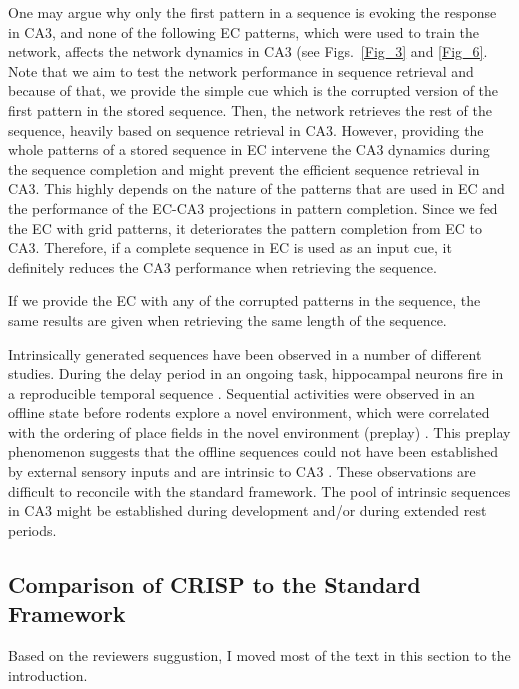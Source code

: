 \documentclass[utf8]{frontiersSCNS} %
\begin{document}
One may argue why only the first pattern in a sequence is evoking the response in CA3, and none of the following EC patterns, which were used to train the network, affects the network dynamics in CA3 (see Figs.~\ref{Fig_3} and \ref{Fig_6}.  
Note that we aim to test the network performance in sequence retrieval and because of that, we provide the simple cue which is the corrupted version of the first pattern in the stored sequence. Then, the network retrieves the rest of the sequence, heavily based on sequence retrieval in CA3. 
However, providing the whole patterns of a stored sequence in EC intervene the CA3 dynamics during the sequence completion and might prevent the efficient sequence retrieval in CA3. This highly depends on the nature of the patterns that are used in EC and the performance of the EC-CA3 projections in pattern completion. Since we fed the EC with grid patterns, it deteriorates the pattern completion from EC to CA3. Therefore, if a complete sequence in EC is used as an input cue, it definitely reduces the CA3 performance when retrieving the sequence.

If we provide the EC with any of the corrupted patterns in the sequence, the same results are given when retrieving the same length of the sequence.  



Intrinsically generated sequences have been observed in a number of different studies. During the delay period in an ongoing task, hippocampal neurons fire in a reproducible temporal sequence \citep{pastalkova2008internally, macdonald2011hippocampal}.  Sequential activities were observed in an offline state before rodents explore a novel environment, which were correlated with the ordering of place fields in the novel environment (preplay) \citep{dragoi2011preplay}. This preplay phenomenon suggests that the offline sequences could not have been established by external sensory inputs and are intrinsic to CA3 \citep{azizi2013computational}. These observations are difficult to reconcile with the standard framework. The pool of intrinsic sequences in CA3 might be established during development and/or during extended rest periods.  


\subsection{Comparison of CRISP to the Standard Framework}
Based on the reviewers suggustion, I moved most of the text in this section to the introduction.
\end{document}
